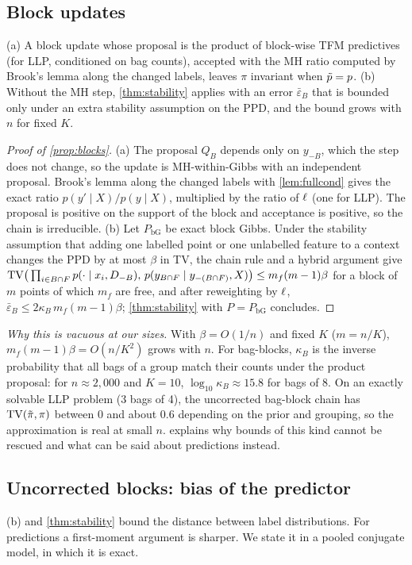 \subsection{Block updates}
\begin{proposition}[Blocks]\label{prop:blocks}
(a) A block update whose proposal is the product of block-wise TFM predictives (for LLP, conditioned on bag counts),
accepted with the MH ratio computed by Brook's lemma along the changed labels, leaves $\pi$ invariant when $\tilde p=p$.
(b) Without the MH step, \cref{thm:stability} applies with an error $\bar\varepsilon_B$ that is bounded only under an
extra stability assumption on the PPD, and the bound grows with $n$ for fixed $K$.
\end{proposition}
\begin{proof}[Proof of \cref{prop:blocks}]
(a) The proposal $Q_B$ depends only on $y_{-B}$, which the step does not change, so the update is MH-within-Gibbs with
an independent proposal. Brook's lemma along the changed labels with \cref{lem:fullcond} gives the exact ratio
$p(y'\mid X)/p(y\mid X)$, multiplied by the ratio of $\ell$ (one for LLP). The proposal is positive on the support of the
block and acceptance is positive, so the chain is irreducible.
(b) Let $P_{\mathrm{bG}}$ be exact block Gibbs. Under the stability assumption that adding one labelled point or one
unlabelled feature to a context changes the PPD by at most $\beta$ in TV, the chain rule and a hybrid argument give
$\mathrm{TV}\big(\prod_{i\in B\cap F}p(\cdot\mid x_i,D_{-B}),\,p(y_{B\cap F}\mid y_{-(B\cap F)},X)\big)\le m_f(m-1)\beta$
for a block of $m$ points of which $m_f$ are free, and after reweighting by $\ell$,
$\bar\varepsilon_B\le2\kappa_B\,m_f(m-1)\beta$; \cref{thm:stability} with $P=P_{\mathrm{bG}}$ concludes.
\end{proof}
\emph{Why this is vacuous at our sizes.} With $\beta=O(1/n)$ and fixed $K$ ($m=n/K$), $m_f(m-1)\beta=O(n/K^2)$ grows
with $n$. For bag-blocks, $\kappa_B$ is the inverse probability that all bags of a group match their counts under the
product proposal: for $n\approx2{,}000$ and $K=10$, $\log_{10}\kappa_B\approx15.8$ for bags of 8. On an exactly solvable
LLP problem (3 bags of 4), the uncorrected bag-block chain has $\mathrm{TV}(\tilde\pi,\pi)$ between 0 and about 0.6 depending on
the prior and grouping, so the approximation is real at small $n$.  explains why bounds of this kind cannot be
rescued and what can be said about predictions instead.

\subsection{Uncorrected blocks: bias of the predictor}\label{app:blockbias}
(b) and \cref{thm:stability} bound the distance between label distributions. For predictions a
first-moment argument is sharper. We state it in a pooled conjugate model, in which it is exact.

